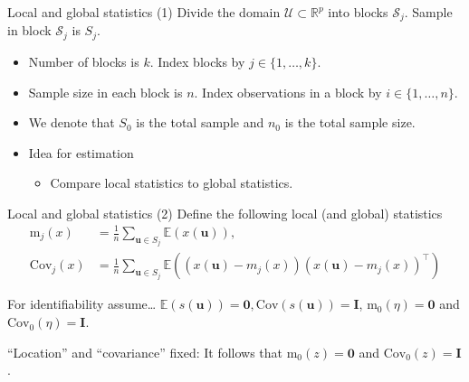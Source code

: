 \documentclass{beamer}
\begin{document}
\begin{frame}{Local and global statistics (1)}
  Divide the domain $\mathcal{U}\subset\mathbb{R}^p$ into blocks $\mathcal{S}_j$.
  Sample in block $\mathcal{S}_j$ is $S_j$.
  \begin{itemize}
    \item Number of blocks is $k$. Index blocks by $j\in\{1,\ldots, k\}$.
    \item Sample size in each block is $n$. Index observations in a block by
    $i\in\{1, \ldots, n\}$.
    \pause
    \item We denote that $S_0$ is the total sample and $n_0$ is the total sample
    size.
    \pause
    \item Idea for estimation
    \begin{itemize}
      \item[$\Rightarrow$] Compare local statistics to global statistics.
    \end{itemize}
  \end{itemize}
\end{frame}

\begin{frame}{Local and global statistics (2)}
  Define the following local (and global) statistics
  \begin{equation*}
    \begin{split}
      \mathrm{m}_{j}(x) &= \frac{1}{n} \sum_{\bm u\in S_j}
      \mathbb{E}\left(x(\bm u)\right), \\
      \mathrm{Cov}_{j}(x) &= \frac{1}{n} \sum_{\bm u\in S_j}
      \mathbb{E}\left(\left(x(\bm u) - m_j(x)\right)
      \left(x(\bm u) - m_j(x)\right)^\intercal\right)
    \end{split}
  \end{equation*}
\end{frame}


\begin{frame}{For identifiability assume\ldots}
  $\mathbb{E}(s(\bm u)) = \bm 0, \mathrm{Cov}\left(s(\bm u)\right) = \bm I$,
  $\mathrm{m}_{0}(\eta) = \bm 0$ and $\mathrm{Cov}_{0}(\eta) = \bm I$.
  \vspace{.5cm}
  \pause

  ``Location'' and ``covariance'' fixed: It follows that $\mathrm{m}_0(z) = \bm
  0$ and $\mathrm{Cov}_0\left(z\right) = \bm I$.
\end{frame}

\end{document}
